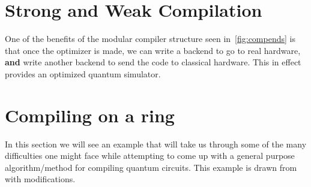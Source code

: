 \section{Strong and Weak Compilation}


One of the benefits of the modular compiler structure seen in~\cref{fig:compends} is that once the optimizer is made, we can write a backend to go to real hardware, \textbf{and} write another backend to send the code to classical hardware.
This in effect provides an optimized quantum simulator.

\section{Compiling on a ring}

In this section we will see an example that will take us through some of the many difficulties one might face while attempting to come up with a general purpose algorithm/method for compiling quantum circuits.
This example is drawn from~\cite{ring-compilation} with modifications.

